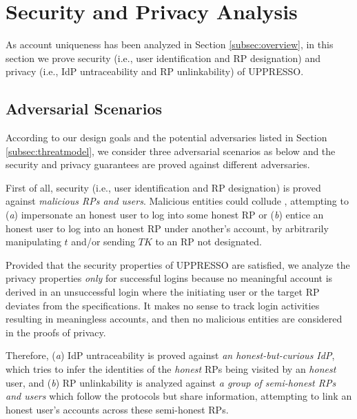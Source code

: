 \section{Security and Privacy Analysis}
\label{sec:analysis}

As account uniqueness has been analyzed in Section \ref{subsec:overview},
in this section we prove security (i.e., user identification and RP designation) and privacy (i.e., IdP untraceability and RP unlinkability) of UPPRESSO.


\subsection{Adversarial Scenarios}

According to our design goals %
 and the potential adversaries listed in Section \ref{subsec:threatmodel}, we consider three adversarial scenarios as below
 and the security and privacy guarantees are proved against different adversaries.


First of all, security (i.e., user identification and RP designation) is proved against \emph{malicious RPs and users}.
 Malicious entities could collude \cite{FettKS14,BrowserID,SPRESSO},
  attempting to (\emph{a}) impersonate an honest user to log into some honest RP
   or (\emph{b}) entice an honest user to log into an honest RP under another's account, 
by arbitrarily manipulating $t$ and/or sending $TK$ to an RP not designated.

Provided that the security properties of UPPRESSO are satisfied,
    we analyze the privacy properties \emph{only} for successful logins
    because no meaningful account is derived in an unsuccessful login
where the initiating user or the target RP deviates from the specifications.
It makes no sense to track login activities resulting in meaningless accounts,
    and then no malicious entities are considered in the proofs of privacy.

Therefore, (\emph{a}) IdP untraceability is proved against \emph{an honest-but-curious IdP}, which tries to infer the identities of the \emph{honest} RPs being visited by an \emph{honest} user,
and (\emph{b}) RP unlinkability is analyzed against \emph{a group of semi-honest RPs and users} which follow the protocols but share information,
    attempting to link an honest user's accounts across these semi-honest RPs.

